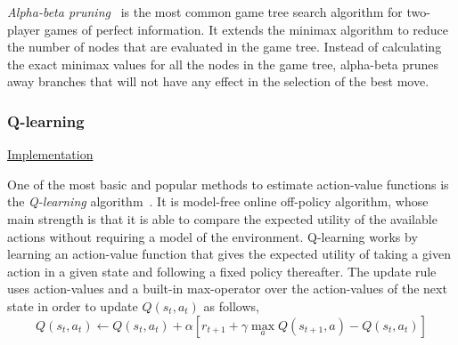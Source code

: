 \documentclass{article}
\newcommand{\GithubURL}[2]{
\noindent
\href{https://github.com/davidrobles/mlnd-capstone-code/blob/master/#1}{#2}
\break
}
\begin{document}

\emph{Alpha-beta pruning}~\citep{Knuth1975AB} is the most common game tree search algorithm for
two-player games of perfect information. It extends the minimax algorithm to reduce the number of
nodes that are evaluated in the game tree. Instead of calculating the exact minimax values for all
the nodes in the game tree, alpha-beta prunes away branches that will not have any effect in the
selection of the best move.




\subsubsection{Q-learning}

\GithubURL{capstone/algorithms/qlearning.py}{Implementation}

One of the most basic and popular methods to estimate action-value functions is the
\emph{Q-learning} algorithm~\citep{Watkins1989PhD}. It is model-free online off-policy algorithm,
whose main strength is that it is able to compare the expected utility of the available actions
without requiring a model of the environment. Q-learning works by learning an action-value function
that gives the expected utility of taking a given action in a given state and following a fixed
policy thereafter. The update rule uses action-values and a built-in max-operator over the
action-values of the next state in order to update $Q(s_t, a_t)$ as follows,
%
\begin{equation}
    Q(s_t, a_t) \gets Q(s_t, a_t) + \alpha [r_{t+1} + \gamma \max_a Q(s_{t+1}, a) - Q(s_t, a_t)]
\end{equation}
\end{document}
